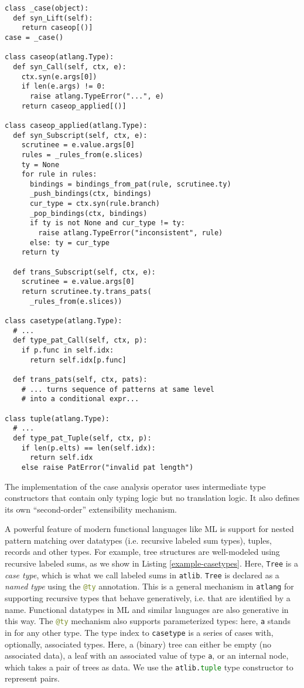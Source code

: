 \documentclass[9pt]{sigplanconf}
\newcommand{\lstinlinep}[1]{\lstinline[language=Python,basicstyle=\ttfamily\small,deletendkeywords={tuple,buffer,map}]{#1}}
\begin{document}
\begin{codelisting}[t]
\begin{lstlisting}
class _case(object):
  def syn_Lift(self):
    return caseop[()]
case = _case()

class caseop(atlang.Type):
  def syn_Call(self, ctx, e):
    ctx.syn(e.args[0])
    if len(e.args) != 0:
      raise atlang.TypeError("...", e)
    return caseop_applied[()]

class caseop_applied(atlang.Type):
  def syn_Subscript(self, ctx, e):
    scrutinee = e.value.args[0]
    rules = _rules_from(e.slices)
    ty = None
    for rule in rules:
      bindings = bindings_from_pat(rule, scrutinee.ty)
      _push_bindings(ctx, bindings)
      cur_type = ctx.syn(rule.branch)
      _pop_bindings(ctx, bindings)
      if ty is not None and cur_type != ty:
        raise atlang.TypeError("inconsistent", rule)
      else: ty = cur_type
    return ty

  def trans_Subscript(self, ctx, e):
    scrutinee = e.value.args[0]
    return scrutinee.ty.trans_pats(
      _rules_from(e.slices))

class casetype(atlang.Type):
  # ...
  def type_pat_Call(self, ctx, p):
    if p.func in self.idx: 
      return self.idx[p.func]

  def trans_pats(self, ctx, pats):
    # ... turns sequence of patterns at same level 
    # into a conditional expr...

class tuple(atlang.Type):
  # ...
  def type_pat_Tuple(self, ctx, p):
    if len(p.elts) == len(self.idx):
      return self.idx
    else raise PatError("invalid pat length") 
\end{lstlisting}
\caption{The implementation of the case analysis operator uses intermediate type constructors that contain only typing logic but no translation logic. It also defines its own ``second-order'' extensibility mechanism.}
\label{example-casetypes-impl}
\end{codelisting}
A powerful feature of modern functional languages like ML is support for nested pattern matching over datatypes (i.e. recursive labeled sum types), tuples, records and other types. For example, tree structures are well-modeled using recursive labeled sums, as we show in Listing \ref{example-casetypes}. Here, \lstinlinep{Tree} is a \emph{case type}, which is what we call labeled sums in \lstinlinep{atlib}. \lstinlinep{Tree} is declared as a \emph{named type} using the \lstinlinep{@ty} annotation. This is a general mechanism in \lstinlinep{atlang} for supporting recursive types that behave generatively, i.e. that are identified by a name. Functional datatypes in ML and similar languages are also generative in this way. The \lstinlinep{@ty} mechanism also supports parameterized types: here, \lstinlinep{a} stands in for any other type. The type index to \lstinlinep{casetype} is a series of cases with, optionally, associated types. Here, a (binary) tree can either be empty (no associated data), a leaf with an associated value of type \lstinlinep{a}, or an internal node, which takes a pair of trees as data. We use the \lstinlinep{atlib.tuple} type constructor to represent pairs.
\end{document}
